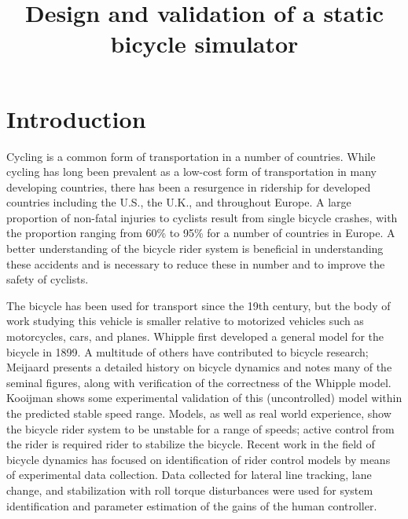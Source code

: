 \documentclass[11pt,a4paper,reqno]{amsart}
\title{Design and validation of a static bicycle simulator}
\begin{document}
\maketitle

\section{Introduction}
Cycling is a common form of transportation in a number of countries.
While cycling has long been prevalent as a low-cost form of transportation in many developing countries,
there has been a resurgence in ridership for developed countries including
the U.S.\cite{mckenzie2014}, the U.K.\cite{FIXME}, and throughout Europe\cite{FIXME}.
A large proportion of non-fatal injuries to cyclists result from single bicycle crashes,
with the proportion ranging from 60\% to 95\% for a number of countries in Europe\cite{schepers2014}.
A better understanding of the bicycle rider system is beneficial in understanding these accidents and is necessary to
reduce these in number and to improve the safety of cyclists.

The bicycle has been used for transport since the 19th century\cite{wilson2004}, but the body of work studying this
vehicle is smaller relative to motorized vehicles such as motorcycles, cars, and planes.
Whipple first developed a general model for the bicycle in 1899\cite{whipple1899}.
A multitude of others have contributed to bicycle research; Meijaard presents a detailed history on bicycle dynamics and
notes many of the seminal figures, along with verification of the correctness of the Whipple model\cite{meijaard2007}.
Kooijman shows some experimental validation of this (uncontrolled) model within the predicted stable speed
range\cite{kooijman2008}.
Models, as well as real world experience, show the bicycle rider system to be unstable for a range of speeds;
active control from the rider is required rider to stabilize the bicycle.
Recent work in the field of bicycle dynamics has focused on identification of rider control
models by means of experimental data collection\cite{delange2011,hess2012,hladun2015}.
Data collected for lateral line tracking\cite{delange2011,hess2012}, lane change\cite{hladun2015}, and stabilization
with roll torque disturbances\cite{delange2011,hess2012} were used for system identification and parameter estimation of
the gains of the human controller.
\end{document}
